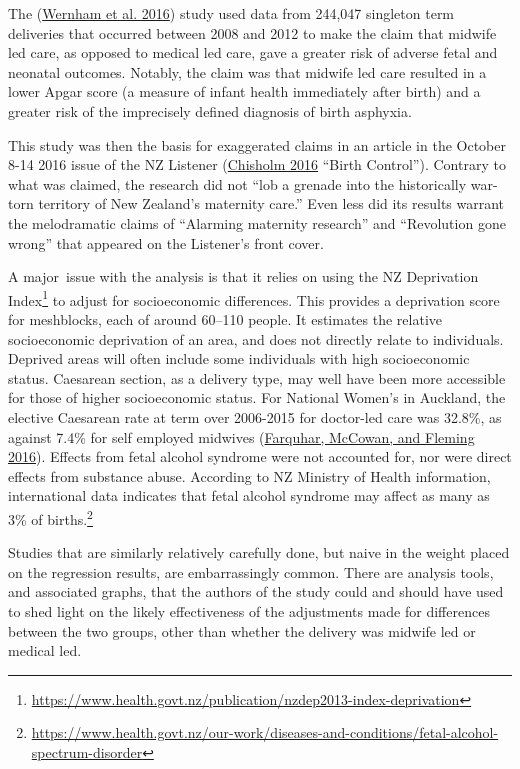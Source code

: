 \documentclass[
  10pt,
  b5paper]{book}
\begin{document}
The (\protect\hyperlink{ref-wernham_EtAl_2016}{Wernham et al. 2016}) study used data from 244,047 singleton term
deliveries that occurred between 2008 and 2012 to make the claim
that midwife led care, as opposed to medical led care, gave a
greater risk of adverse fetal and neonatal outcomes. Notably, the
claim was that midwife led care resulted in a lower Apgar score
(a measure of infant health immediately after birth) and a greater
risk of the imprecisely defined diagnosis of birth asphyxia.

This study was then the basis for exaggerated claims in an article
in the October 8-14 2016 issue of the NZ Listener
(\protect\hyperlink{ref-chisholm_2016}{Chisholm 2016} {``Birth Control''}). Contrary to what was
claimed, the research did not
``lob a grenade into the historically war-torn territory of
New Zealand's maternity care.''
Even less did its results warrant the melodramatic claims of
``Alarming maternity research'' and ``Revolution gone wrong'' that
appeared on the Listener's front cover.

A major~issue with the analysis is that it relies on using the NZ
Deprivation Index\footnote{
  \url{https://www.health.govt.nz/publication/nzdep2013-index-deprivation}}
to adjust for socioeconomic differences. This provides a deprivation
score for meshblocks, each of around 60--110 people. It estimates the
relative socioeconomic deprivation of an area, and does not directly
relate to individuals. Deprived areas will often include some
individuals with high socioeconomic status. Caesarean section, as a
delivery type, may well have been more accessible for those of
higher socioeconomic status. For National Women's in Auckland,
the elective Caesarean rate at term over 2006-2015 for doctor-led
care was 32.8\%, as against 7.4\% for self employed midwives
(\protect\hyperlink{ref-farquhar2016letter}{Farquhar, McCowan, and Fleming 2016}). Effects from fetal alcohol syndrome were
not accounted for, nor were direct effects from substance abuse.
According to NZ Ministry of Health information, international data
indicates that fetal alcohol syndrome may affect as many as 3\% of
births.\footnote{\url{https://www.health.govt.nz/our-work/diseases-and-conditions/fetal-alcohol-spectrum-disorder}}

Studies that are similarly relatively carefully done,
but naive in the weight placed on the regression results,
are embarrassingly common. There are analysis tools, and
associated graphs, that the authors of the study could
and should have used to shed light on the likely
effectiveness of the adjustments made for differences
between the two groups, other than whether the delivery
was midwife led or medical led.
\end{document}
